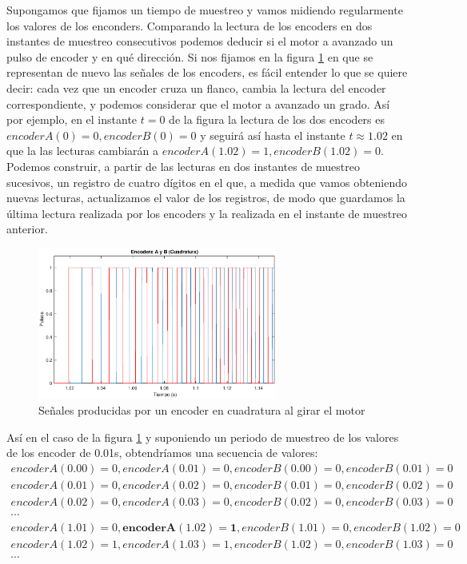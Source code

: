 \documentclass[10pt,a4paper]{report}
\begin{document}
Supongamos que fijamos un tiempo de muestreo y vamos midiendo regularmente los valores de los enconders. Comparando la lectura de los encoders en dos instantes de muestreo consecutivos podemos deducir si el motor a avanzado un pulso de encoder y en qué dirección. Si nos fijamos en la figura \ref{f6bis} en que se  representan de nuevo las señales de los encoders, es fácil entender lo que se quiere decir: cada vez que un encoder cruza un flanco, cambia la lectura del encoder correspondiente, y podemos considerar que el motor a avanzado un grado. Así por ejemplo, en el instante $t=0$ de la figura la lectura de los dos encoders es $encoderA(0) = 0, encoderB(0) = 0$ y seguirá así hasta el instante $t \approx 1.02$ en que la las lecturas cambiarán a $encoderA(1.02) = 1, encoderB(1.02) = 0$. Podemos construir, a partir de las lecturas en dos instantes de muestreo sucesivos, un registro de cuatro dígitos en el que, a medida que vamos obteniendo nuevas lecturas, actualizamos el valor de los registros, de modo que guardamos la última lectura realizada por los encoders y la realizada en el instante de muestreo anterior. 
\begin{figure}
\centering
\includegraphics[width= 0.7\textwidth]{encoderab.eps}
\caption{Señales producidas por un encoder en cuadratura al girar el motor }\label{f6bis}
\end{figure} 
Así en el caso de la figura \ref{f6bis} y suponiendo un periodo de muestreo de los valores de los encoder de 0.01s, obtendríamos una secuencia de valores:
\begin{align*}
encoderA(0.00) = 0, encoderA(0.01) = 0,encoderB(0.00) = 0, encoderB(0.01) = 0\\
encoderA(0.01) = 0,encoderA(0.02) = 0,encoderB(0.01) = 0, encoderB(0.02) = 0\\
encoderA(0.02) = 0,encoderA(0.03) = 0,encoderB(0.02) = 0, encoderB(0.03) = 0\\
\cdots \\
encoderA(1.01) = 0,\mathbf{encoderA(1.02) = 1},encoderB(1.01) = 0, encoderB(1.02) = 0\\
encoderA(1.02) = 1,encoderA(1.03) = 1,encoderB(1.02) = 0, encoderB(1.03) = 0\\
\cdots
\end{align*}
\end{document}

